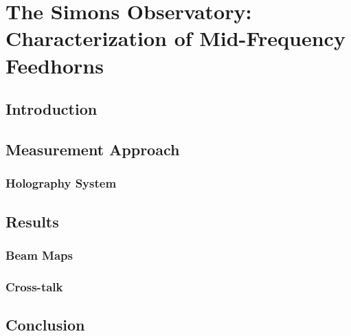 \chapter{The Simons Observatory: Characterization of Mid-Frequency Feedhorns}
\section{Introduction}
\section{Measurement Approach}
\subsection{Holography System}
\section{Results}
\subsection{Beam Maps}
\subsection{Cross-talk}
\section{Conclusion}